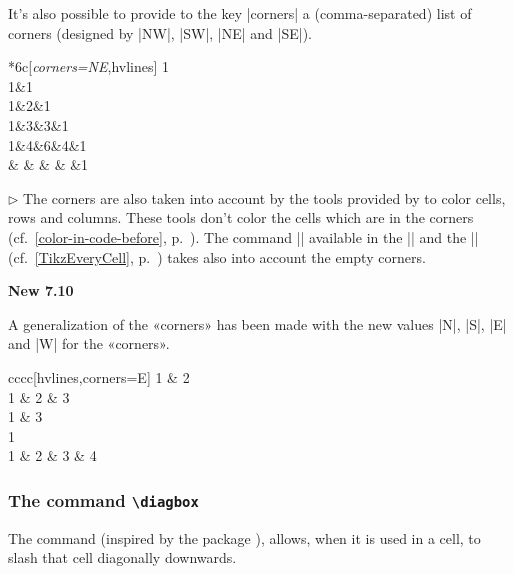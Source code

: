 \documentclass[dvipsnames]{article}
\begin{document}
\bigskip
It's also possible to provide to the key |corners| a (comma-separated) list of
corners (designed by |NW|, |SW|, |NE| and |SE|).

\medskip
\begin{Code}[width=11cm,show-output]
\begin{NiceTabular}{*{6}{c}}[\emph{corners=NE},hvlines]
  1\\
  1&1\\
  1&2&1\\
  1&3&3&1\\
  1&4&6&4&1\\
   & & & & &1
\end{NiceTabular}
\end{Code}


\medskip
$\triangleright$ The corners are also taken into account by the tools provided
by  to color cells, rows and columns. These tools don't color
the cells which are in the corners (cf.~\ref{color-in-code-before},
p.~\pageref{color-in-code-before}). The command |\TikzEveryCell| available in
the |\CodeBefore| and the |\CodeAfter| (cf.~\ref{TikzEveryCell},
p.~\pageref{TikzEveryCell}) takes also into account the empty corners.

\medskip
\colorbox{yellow!50}{\bfseries New 7.10}

\smallskip
\nobreak
A generalization of the «corners» has been made with the new values |N|, |S|, |E| and |W|
for the «corners».

\smallskip
\begin{Code}[width=11cm,show-output]
\begin{NiceTabular}{cccc}[hvlines,corners=E]
1 & 2 \\
1 & 2 & 3 \\
1 & 3 \\
1 \\
1 & 2 & 3 & 4 \\
\end{NiceTabular}
\end{Code}



\subsubsection{The command \texttt{\textbackslash diagbox}}


The command  (inspired by the package ),
allows, when it is used in a cell, to slash that cell diagonally downwards.
\end{document}
